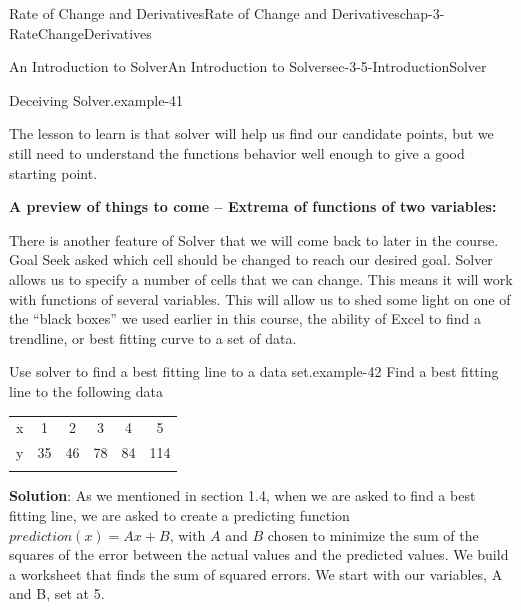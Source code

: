 \documentclass[oneside,10pt,]{book}
\newcommand{\terminology}[1]{\textbf{#1}}
\numberwithin{equation}{section}
\newcommand{\hrulethin}  {\noalign{\hrule height 0.04em}}
\newcommand{\hrulethick} {\noalign{\hrule height 0.11em}}
\begin{document}
\begin{chapterptx}{Rate of Change and Derivatives}{}{Rate of Change and Derivatives}{}{}{chap-3-RateChangeDerivatives}
\begin{sectionptx}{An Introduction to Solver}{}{An Introduction to Solver}{}{}{sec-3-5-IntroductionSolver}
\begin{example}{Deceiving Solver.}{example-41}
\begin{sidebyside}{1}{0.15}{0.15}{0}
\begin{sbspanel}{0.7}
\end{sbspanel}%
\end{sidebyside}%
\end{example}
\hypertarget{p-1354}{}%
The lesson to learn is that solver will help us find our candidate points, but we still need to understand the functions behavior well enough to give a good starting point.%
\par
\hypertarget{p-1355}{}%
\terminology{A preview of things to come – Extrema of functions of two variables:}%
\par
\hypertarget{p-1356}{}%
There is another feature of Solver that we will come back to later in the course.  Goal Seek asked which cell should be changed to reach our desired goal.  Solver allows us to specify a number of cells that we can change.  This means it will work with functions of several variables.  This will allow us to shed some light on one of the ``black boxes'' we used earlier in this course, the ability of Excel to find a trendline, or best fitting curve to a set of data.%
\begin{example}{Use solver to find a best fitting line to a data set.}{example-42}%
\hypertarget{p-1357}{}%
Find a best fitting line to the following data%
\begin{sidebyside}{1}{0}{0}{0}%
\begin{sbspanel}{1}%
{\centering%
\begin{tabular}{cccccc}\hrulethick
x&1&2&3&4&5\tabularnewline\hrulethin
y&35&46&78&84&114\tabularnewline\hrulethin
\end{tabular}
\par}
\end{sbspanel}%
\end{sidebyside}%
\par
\hypertarget{p-1358}{}%
\terminology{Solution}:  As we mentioned in section 1.4, when we are asked to find a best fitting line, we are asked to create a predicting function \(prediction(x)=A x+B\), with \(A\) and \(B\) chosen to minimize the sum of the squares of the error between the actual values and the predicted values.  We build a worksheet that finds the sum of squared errors.  We start with our variables, A and B, set at 5.%
\begin{sidebyside}{1}{0.15}{0.15}{0}%
\begin{sbspanel}{0.7}%

\end{sbspanel}
\end{sidebyside}
\end{example}
\end{sectionptx}
\end{chapterptx}
\end{document}
